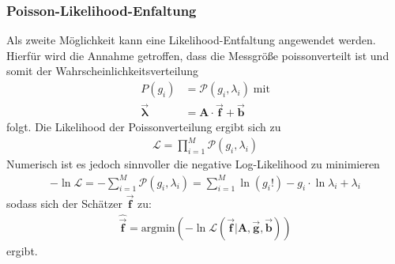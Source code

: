 \subsubsection{Poisson-Likelihood-Enfaltung}
Als zweite Möglichkeit kann eine Likelihood-Entfaltung angewendet werden. 
Hierfür wird die Annahme getroffen, dass die Messgröße poissonverteilt ist und somit der Wahrscheinlichkeitsverteilung
\begin{align}
	P(g_{i}) &= \mathcal{P}(g_{i},\lambda_{i}) \; \text{mit}\\
	\vec{\pmb{\lambda}} &= \pmb{A} \cdot \vec{\pmb{f}} + \vec{\pmb{b}}
\end{align}
folgt.
Die Likelihood der Poissonverteilung ergibt sich zu
\begin{align}
	\mathcal{L} = \prod_{i=1}^{M}\mathcal{P}(g_{i},\lambda_{i})
\end{align}
Numerisch ist es jedoch sinnvoller die negative Log-Likelihood zu minimieren
\begin{align}
	- \ln\mathcal{L} = - \sum_{i=1}^{M}\mathcal{P}(g_{i},\lambda_{i}) = \sum_{i=1}^{M}\ln(g_{i}!) - g_{i} \cdot \ln \lambda_{i} +\lambda_{i}
	\label{eqn:loglike}
\end{align}
sodass sich der Schätzer $\vec{\pmb{f}}$ zu:
\begin{align}
	\hat{\vec{\pmb{f}}} = \text{argmin}\left(- \ln\mathcal{L}( \vec{\pmb{f}}|\pmb{A},\vec{\pmb{g}},\vec{\pmb{b}})\right)
	\label{eqn:fLike}
\end{align}
ergibt.

